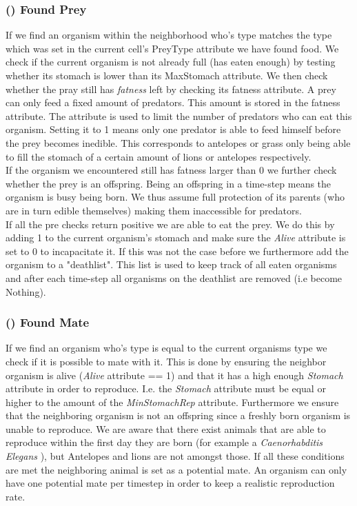 \documentclass[11pt]{article}
\begin{document}
\subsubsection{() Found Prey}
If we find an organism within the neighborhood who's type matches the type which was set in the current cell's PreyType attribute we have found food. We check if the current organism is not already full (has eaten enough) by testing whether its stomach is lower than its MaxStomach attribute. We then check whether the pray still has {\it fatness} left by checking its fatness attribute. A prey can only feed a fixed amount of predators. This amount is stored in the fatness attribute. The attribute is used to limit the number of predators who can eat this organism. Setting it to 1 means only one predator is able to feed himself before the prey becomes inedible. This corresponds to antelopes or grass only being able to fill the stomach of a certain amount of lions or antelopes respectively.\\
If the organism we encountered still has fatness larger than 0 we further check whether the prey is an offspring. Being an offspring in a time-step means the organism is busy being born. We thus assume full protection of its parents (who are in turn edible themselves) making them inaccessible for predators.\\
If all the pre checks return positive we are able to eat the prey. We do this by adding 1 to the current organism's stomach and make sure the {\it Alive} attribute is set to 0 to incapacitate it. If this was not the case before we furthermore add the organism to a "deathlist". This list is used to keep track of all eaten organisms and after each time-step all organisms on the deathlist are removed (i.e become Nothing). 

\addtocounter{protocolCounter}{1}
\subsubsection{() Found Mate}
If we find an organism who's type is equal to the current organisms type we check if it is possible to mate with it. This is done by ensuring the neighbor organism is alive ({\it Alive} attribute == 1) and that it has a high enough {\it Stomach} attribute in order to reproduce. I.e. the {\it Stomach} attribute must be equal or higher to the amount of the {\it MinStomachRep} attribute. Furthermore we ensure that the neighboring organism is not an offspring since a freshly born organism is unable to reproduce. We are aware that there exist animals that are able to reproduce within the first day they are born (for example a {\it Caenorhabditis Elegans} \cite{caenorhabditisElegans}), but Antelopes and lions are not amongst those. If all these conditions are met the neighboring animal is set as a potential mate. An organism can only have one potential mate per timestep in order to keep a realistic reproduction rate.
\end{document}
